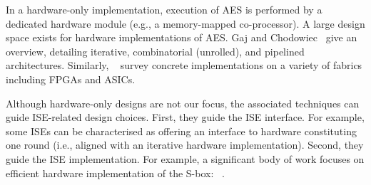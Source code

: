 
In a hardware-only implementation,
execution of 
AES
is 
performed by 
a dedicated hardware module (e.g., a memory-mapped co-processor).
A large design space exists for hardware implementations of AES.
Gaj and Chodowiec~\cite[Section 3.3]{GajCho:00}
give an overview, detailing
iterative,
combinatorial (unrolled),
and
pipelined architectures.
Similarly, ~\cite{PMDW:04,GooBen:05,GajCho:09}
survey concrete implementations on a variety of fabrics including FPGAs
and ASICs.

Although hardware-only designs are not our focus, the associated techniques
can guide ISE-related design choices.
First,
they guide the ISE interface.
For example, some ISEs can be characterised as offering an interface to
hardware constituting one round 
(i.e., aligned with an iterative hardware implementation).
Second,
they guide the ISE implementation.
For example, a significant body of work focuses on efficient hardware 
implementation of the S-box: ~\cite{Canright:05,BoyPer:12,ReyTahAsh:18}.


